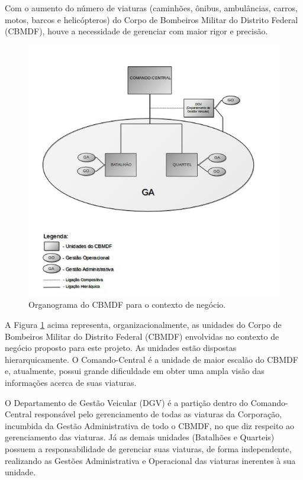   Com o aumento do número de viaturas (caminhões, ônibus, ambulâncias, carros, motos, barcos e helicópteros) do Corpo de 
  Bombeiros Militar do Distrito Federal (CBMDF), houve a necessidade de gerenciar com maior rigor e precisão.

  \begin{figure}[!htbp]
    \centering
    \includegraphics[scale=0.7, angle=0]{figuras/entendimento_negocio}
    \caption{Organograma do CBMDF para o contexto de negócio.}
    \label{entendimento_negocio}
  \end{figure}
  
  A Figura \ref{entendimento_negocio} acima representa, organizacionalmente, as unidades do Corpo de Bombeiros Militar do Distrito Federal (CBMDF)
  envolvidas no contexto de negócio proposto para este projeto. As unidades estão dispostas hierarquicamente. 
  O Comando-Central é a unidade de maior escalão do CBMDF e, atualmente, possui grande dificuldade em obter uma ampla 
  visão das informações acerca de suas viaturas.
  
  O Departamento de Gestão Veicular (DGV) é a partição dentro do Comando-Central responsável pelo gerenciamento de todas 
  as viaturas da Corporação, incumbida da Gestão Administrativa de todo o CBMDF, no que diz respeito ao gerenciamento das 
  viaturas. Já as demais unidades (Batalhões e Quarteis) possuem a responsabilidade de gerenciar suas viaturas, de forma 
  independente, realizando as Gestões Administrativa e Operacional das viaturas inerentes à sua unidade.
  
